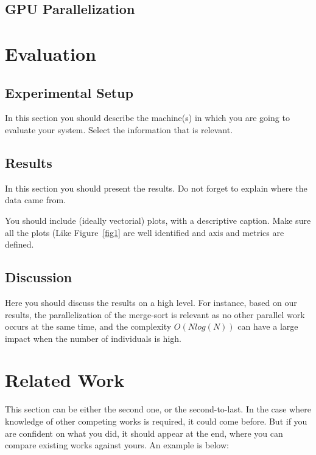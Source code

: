 \documentclass[runningheads]{llncs}
\begin{document}
\subsection{GPU Parallelization}




\section{Evaluation}

\subsection{Experimental Setup}

In this section you should describe the machine(s) in which you are going to evaluate your system. Select the information that is relevant.


\subsection{Results}

In this section you should present the results. Do not forget to explain where the data came from. 

You should include (ideally vectorial) plots, with a descriptive caption. Make sure all the plots (Like Figure~\ref{fig1} are well identified and axis and metrics are defined.

\subsection{Discussion}

Here you should discuss the results on a high level. For instance, based on our results, the parallelization of the merge-sort is relevant as no other parallel work occurs at the same time, and the complexity $O(N log(N))$ can have a large impact when the number of individuals is high.

\section{Related Work}

This section can be either the second one, or the second-to-last. In the case where knowledge of other competing works is required, it could come before. But if you are confident on what you did, it should appear at the end, where you can compare existing works against yours. An example is below:
\end{document}
